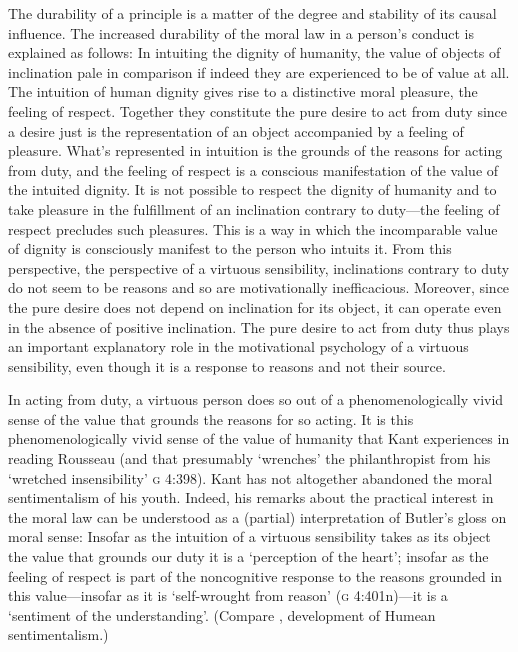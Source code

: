 \documentclass[12pt]{article}
\begin{document}
The durability of a principle is a matter of the degree and stability of its causal influence. The increased durability of the moral law in a person's conduct is explained as follows: In intuiting the dignity of humanity, the value of objects of inclination pale in comparison if indeed they are experienced to be of value at all. The intuition of human dignity gives rise to a distinctive moral pleasure, the feeling of respect. Together they constitute the pure desire to act from duty since a desire just is the representation of an object accompanied by a feeling of pleasure. What's represented in intuition is the grounds of the reasons for acting from duty, and the feeling of respect is a conscious manifestation of the value of the intuited dignity. It is not possible to respect the dignity of humanity and to take pleasure in the fulfillment of an inclination contrary to duty---the feeling of respect precludes such pleasures. This is a way in which the incomparable value of dignity is consciously manifest to the person who intuits it. From this perspective, the perspective of a virtuous sensibility, inclinations contrary to duty do not seem to be reasons and so are motivationally inefficacious. Moreover, since the pure desire does not depend on inclination for its object, it can operate even in the absence of positive inclination. The pure desire to act from duty thus plays an important explanatory role in the motivational psychology of a virtuous sensibility, even though it is a response to reasons and not their source.

In acting from duty, a virtuous person does so out of a phenomenologically vivid sense of the value that grounds the reasons for so acting. It is this phenomenologically vivid sense of the value of humanity that Kant experiences in reading Rousseau (and that presumably `wrenches' the philanthropist from his `wretched insensibility' \textsc{g} 4:398). Kant has not altogether abandoned the moral sentimentalism of his youth. Indeed, his remarks about the practical interest in the moral law can be understood as a (partial) interpretation of Butler's \citeyearpar{Butler:1736id} gloss on moral sense: Insofar as the intuition of a virtuous sensibility takes as its object the value that grounds our duty it is a `perception of the heart'; insofar as the feeling of respect is part of the noncognitive response to the reasons grounded in this value---insofar as it is `self-wrought from reason' (\textsc{g} 4:401n)---it is a `sentiment of the understanding'. (Compare \citealp{Wiggins:1987ta}, development of Humean sentimentalism.)
\end{document}
